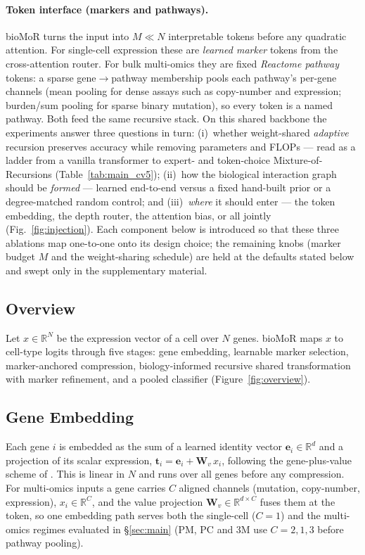 \documentclass[letterpaper]{article}
\begin{document}
\paragraph{Token interface (markers and pathways).}
bioMoR turns the input into $M\ll N$ interpretable tokens before any quadratic
attention. For single-cell expression these are \emph{learned marker} tokens from the
cross-attention router. For bulk multi-omics they are fixed \emph{Reactome pathway}
tokens: a sparse gene$\to$pathway membership pools each pathway's per-gene channels
(mean pooling for dense assays such as copy-number and expression; burden/sum pooling
for sparse binary mutation), so every token is a named pathway. Both feed the same
recursive stack. On this shared backbone the experiments answer three questions in turn:
(i)~whether weight-shared \emph{adaptive} recursion preserves accuracy while removing
parameters and FLOPs --- read as a ladder from a vanilla transformer to expert- and
token-choice Mixture-of-Recursions (Table~\ref{tab:main_cv5}); (ii)~how the biological
interaction graph should be \emph{formed} --- learned end-to-end versus a fixed hand-built
prior or a degree-matched random control; and (iii)~\emph{where} it should enter --- the
token embedding, the depth router, the attention bias, or all jointly (Fig.~\ref{fig:injection}). Each component below
is introduced so that these three ablations map one-to-one onto its design choice; the
remaining knobs (marker budget $M$ and the weight-sharing schedule) are held at the defaults
stated below and swept only in the supplementary material.


\subsection{Overview}
Let $x \in \mathbb{R}^{N}$ be the expression vector of a cell over $N$ genes. bioMoR
maps $x$ to cell-type logits through five stages: gene embedding, learnable marker
selection, marker-anchored compression, biology-informed recursive shared
transformation with marker refinement, and a pooled classifier
(Figure~\ref{fig:overview}).

\subsection{Gene Embedding}
Each gene $i$ is embedded as the sum of a learned identity vector
$\mathbf{e}_i \in \mathbb{R}^d$ and a projection of its scalar expression,
$\mathbf{t}_i = \mathbf{e}_i + \mathbf{W}_v\, x_i$, following the gene-plus-value
scheme of \cite{cui2024scgpt,theodoris2023transfer}. This is linear in $N$ and runs
over all genes before any compression. For multi-omics inputs a
gene carries $C$ aligned channels (mutation, copy-number, expression), $x_i\in\mathbb{R}^{C}$, and
the value projection $\mathbf{W}_v\in\mathbb{R}^{d\times C}$ fuses them at the token, so one
embedding path serves both the single-cell ($C{=}1$) and the multi-omics regimes evaluated in
\S\ref{sec:main} (PM, PC and 3M use $C{=}2,1,3$ before pathway pooling).
\end{document}
